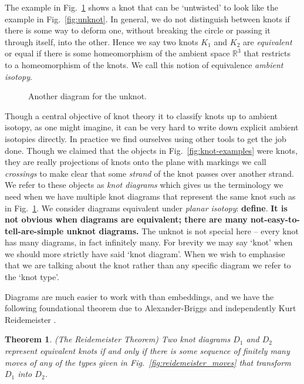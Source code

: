 \documentclass[12pt]{report}
\newcommand{\R}{\mathbb{R}}
\newcommand{\notered}[1]{{\color{Red} \textbf{#1}}}
\newtheorem*{theorem}{Theorem}
\begin{document}
The example in Fig.~\ref{fig:unknot_twisted} shows a knot that can be `untwisted' to look like the example in Fig.~\ref{fig:unknot}. In general, we do not distinguish between knots if there is some way to deform one, without breaking the circle or passing it through itself, into the other. Hence we say two knots $K_{1}$ and $K_{2}$ are \textit{equivalent} or equal if there is some homeomorphism of the ambient space $\R^{3}$ that restricts to a homeomorphism of the knots. We call this notion of equivalence \textit{ambient isotopy}.

\begin{figure}[hbt]
	\centering
	\def\svgscale{0.2}
	
	\caption{Another diagram for the unknot.}
	\label{fig:unknot_twisted}
\end{figure}

Though a central objective of knot theory it to classify knots up to ambient isotopy, as one might imagine, it can be very hard to write down explicit ambient isotopies directly. In practice we find ourselves using other tools to get the job done. Though we claimed that the objects in Fig.~\ref{fig:knot-examples} were knots, they are really projections of knots onto the plane with markings we call \textit{crossings} to make clear that some \textit{strand} of the knot passes over another strand. We refer to these objects as \textit{knot diagrams} which gives us the terminology we need when we have multiple knot diagrams that represent the same knot such as in  Fig.~\ref{fig:unknot_twisted}. We consider diagrams equivalent under \textit{planar isotopy}: \notered{define}. \notered{It is not obvious when diagrams are equivalent; there are many not-easy-to-tell-are-simple unknot diagrams.} The unknot is not special here -- every knot has many diagrams, in fact infinitely many. For brevity we may say `knot' when we should more strictly have said `knot diagram'. When we wish to emphasise that we are talking about the knot rather than any specific diagram we refer to the `knot type'.

Diagrams are much easier to work with than embeddings, and we have the following foundational theorem due to Alexander-Briggs  \cite{types-of-knotted-curves} and independently Kurt Reidemeister \cite{elementary-justification-knot-theory}.
\begin{theorem}(The Reidemeister Theorem)
Two knot diagrams $D_{1}$ and $D_{2}$ represent equivalent knots if and only if there is some sequence of finitely many moves of any of the types given in Fig.~\ref{fig:reidemeister_moves} that transform $D_{1}$ into $D_{2}$.
\end{theorem}
\end{document}
